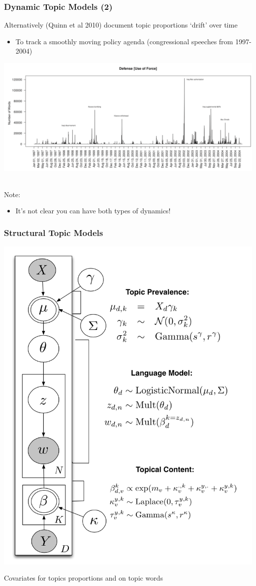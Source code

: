 \documentclass[11pt,compress,professionalfonts]{beamer}
\newcommand{\ita}{\begin{itemize}}
\newcommand{\itm}{\item[]}
\newcommand{\itz}{\end{itemize}}
\begin{document}
\begin{frame}[t]\frametitle{Dynamic Topic Models (2)}

Alternatively (Quinn et al 2010) document topic proportions `drift' over time
\ita
\itm To track a smoothly moving policy agenda (congressional speeches from 1997-2004)
\itz

\centerline{\includegraphics[scale=.5]{pictures/defence-topic-quinn}}

~\\
Note:
\ita
\itm It's not clear you can have both types of dynamics!
\itz

\end{frame}
\begin{frame}[t]\frametitle{Structural Topic Models}

\centerline{\includegraphics[scale=.6]{pictures/stm-graphical-model}}

Covariates for topics proportions and on topic words

\end{frame}
\end{document}
